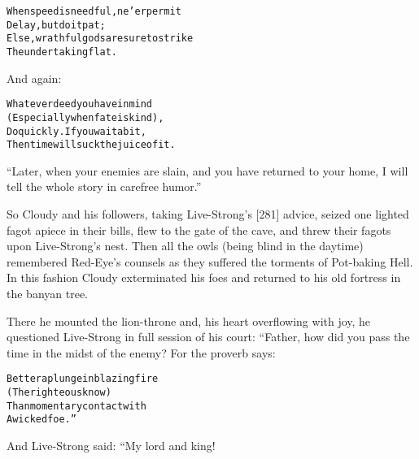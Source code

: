 \documentclass{article}
\renewenvironment{verbatim}{\begin{alltt}\normalfont\begin{centering}}{\end{centering}\end{alltt}}
\begin{document}
\begin{verbatim}
When speed is needful, ne'er permit
    Delay, but do it pat;
Else, wrathful gods are sure to strike
    The undertaking flat.
\end{verbatim}
And again:

\begin{verbatim}
Whatever deed you have in mind
(Especially when fate is kind),
Do quickly. If you wait a bit,
Then time will suck the juice of it.
\end{verbatim}
``Later, when your enemies are slain, and you have returned to your home, I will tell the whole story in carefree humor.''

So Cloudy and his followers, taking Live-Strong's [281] advice,
seized one lighted fagot apiece in their bills, flew to the gate of
the cave, and threw their fagots upon Live-Strong's nest. Then all
the owls (being blind in the daytime) remembered Red-Eye's counsels
as they suffered the torments of Pot-baking Hell. In this fashion
Cloudy exterminated his foes and returned to his old fortress in
the banyan tree.

There he mounted the lion-throne and, his heart overflowing with
joy, he questioned Live-Strong in full session of his court:
“Father, how did you pass the time in the midst of the enemy? For
the proverb says:

\begin{verbatim}
Better a plunge in blazing fire
    (The righteous know)
Than momentary contact with
    A wicked foe.”
\end{verbatim}
And Live-Strong said: “My lord and king!
\end{document}
